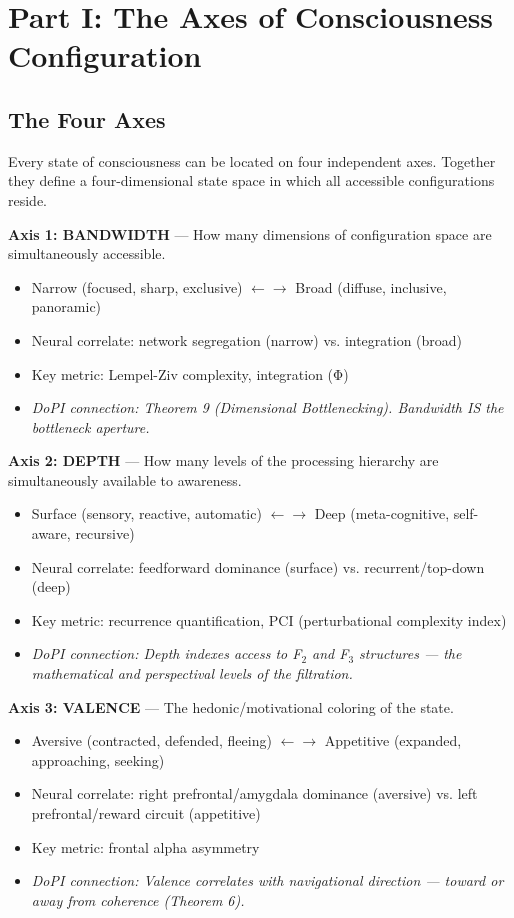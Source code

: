 \section*{Part I: The Axes of Consciousness Configuration}


\subsection*{The Four Axes}


Every state of consciousness can be located on four independent axes. Together they define a four-dimensional state space in which all accessible configurations reside.


\textbf{Axis 1: BANDWIDTH} — How many dimensions of configuration space are simultaneously accessible.

\begin{itemize}[nosep,leftmargin=*]
  \item Narrow (focused, sharp, exclusive) $\leftarrow$$\rightarrow$ Broad (diffuse, inclusive, panoramic)
  \item Neural correlate: network segregation (narrow) vs. integration (broad)
  \item Key metric: Lempel-Ziv complexity, integration (Φ)
  \item \textit{DoPI connection: Theorem 9 (Dimensional Bottlenecking). Bandwidth IS the bottleneck aperture.}
\end{itemize}


\textbf{Axis 2: DEPTH} — How many levels of the processing hierarchy are simultaneously available to awareness.

\begin{itemize}[nosep,leftmargin=*]
  \item Surface (sensory, reactive, automatic) $\leftarrow$$\rightarrow$ Deep (meta-cognitive, self-aware, recursive)
  \item Neural correlate: feedforward dominance (surface) vs. recurrent/top-down (deep)
  \item Key metric: recurrence quantification, PCI (perturbational complexity index)
  \item \textit{DoPI connection: Depth indexes access to F$_2$ and F$_3$ structures — the mathematical and perspectival levels of the filtration.}
\end{itemize}


\textbf{Axis 3: VALENCE} — The hedonic/motivational coloring of the state.

\begin{itemize}[nosep,leftmargin=*]
  \item Aversive (contracted, defended, fleeing) $\leftarrow$$\rightarrow$ Appetitive (expanded, approaching, seeking)
  \item Neural correlate: right prefrontal/amygdala dominance (aversive) vs. left prefrontal/reward circuit (appetitive)
  \item Key metric: frontal alpha asymmetry
  \item \textit{DoPI connection: Valence correlates with navigational direction — toward or away from coherence (Theorem 6).}
\end{itemize}


